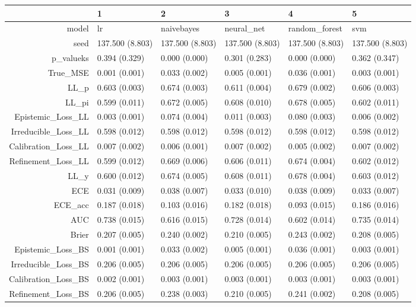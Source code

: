 \begin{table}[ht]
\centering
\begin{tabular}{rlllll}
  \hline
 & 1 & 2 & 3 & 4 & 5 \\ 
  \hline
model & lr & naivebayes & neural\_net & random\_forest & svm \\ 
  seed & 137.500 (8.803) & 137.500 (8.803) & 137.500 (8.803) & 137.500 (8.803) & 137.500 (8.803) \\ 
  p\_valueks & 0.394 (0.329) & 0.000 (0.000) & 0.301 (0.283) & 0.000 (0.000) & 0.362 (0.347) \\ 
  True\_MSE & 0.001 (0.001) & 0.033 (0.002) & 0.005 (0.001) & 0.036 (0.001) & 0.003 (0.001) \\ 
  LL\_p & 0.603 (0.003) & 0.674 (0.003) & 0.611 (0.004) & 0.679 (0.002) & 0.606 (0.003) \\ 
  LL\_pi & 0.599 (0.011) & 0.672 (0.005) & 0.608 (0.010) & 0.678 (0.005) & 0.602 (0.011) \\ 
  Epistemic\_Loss\_LL & 0.003 (0.001) & 0.074 (0.004) & 0.011 (0.003) & 0.080 (0.003) & 0.006 (0.002) \\ 
  Irreducible\_Loss\_LL & 0.598 (0.012) & 0.598 (0.012) & 0.598 (0.012) & 0.598 (0.012) & 0.598 (0.012) \\ 
  Calibration\_Loss\_LL & 0.007 (0.002) & 0.006 (0.001) & 0.007 (0.002) & 0.005 (0.002) & 0.007 (0.002) \\ 
  Refinement\_Loss\_LL & 0.599 (0.012) & 0.669 (0.006) & 0.606 (0.011) & 0.674 (0.004) & 0.602 (0.012) \\ 
  LL\_y & 0.600 (0.012) & 0.674 (0.005) & 0.608 (0.011) & 0.678 (0.004) & 0.603 (0.012) \\ 
  ECE & 0.031 (0.009) & 0.038 (0.007) & 0.033 (0.010) & 0.038 (0.009) & 0.033 (0.007) \\ 
  ECE\_acc & 0.187 (0.018) & 0.103 (0.016) & 0.182 (0.018) & 0.093 (0.015) & 0.186 (0.016) \\ 
  AUC & 0.738 (0.015) & 0.616 (0.015) & 0.728 (0.014) & 0.602 (0.014) & 0.735 (0.014) \\ 
  Brier & 0.207 (0.005) & 0.240 (0.002) & 0.210 (0.005) & 0.243 (0.002) & 0.208 (0.005) \\ 
  Epistemic\_Loss\_BS & 0.001 (0.001) & 0.033 (0.002) & 0.005 (0.001) & 0.036 (0.001) & 0.003 (0.001) \\ 
  Irreducible\_Loss\_BS & 0.206 (0.005) & 0.206 (0.005) & 0.206 (0.005) & 0.206 (0.005) & 0.206 (0.005) \\ 
  Calibration\_Loss\_BS & 0.002 (0.001) & 0.003 (0.001) & 0.003 (0.001) & 0.003 (0.001) & 0.003 (0.001) \\ 
  Refinement\_Loss\_BS & 0.206 (0.005) & 0.238 (0.003) & 0.210 (0.005) & 0.241 (0.002) & 0.208 (0.005) \\ 
   \hline
\end{tabular}
\end{table}
